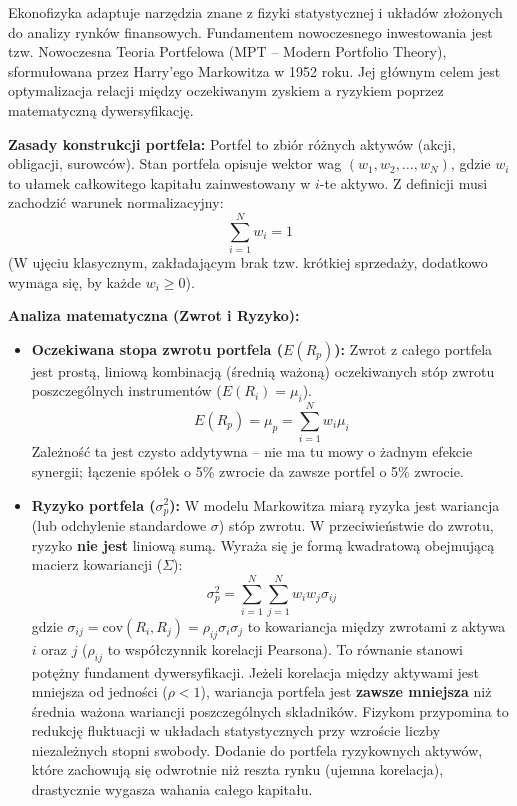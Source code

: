 \documentclass[11pt, a4paper]{article}
\begin{document}
Ekonofizyka adaptuje narzędzia znane z fizyki statystycznej i układów złożonych do analizy rynków finansowych. Fundamentem nowoczesnego inwestowania jest tzw. Nowoczesna Teoria Portfelowa (MPT – Modern Portfolio Theory), sformułowana przez Harry'ego Markowitza w 1952 roku. Jej głównym celem jest optymalizacja relacji między oczekiwanym zyskiem a ryzykiem poprzez matematyczną dywersyfikację.

\textbf{Zasady konstrukcji portfela:}
Portfel to zbiór różnych aktywów (akcji, obligacji, surowców). Stan portfela opisuje wektor wag $(w_1, w_2, \dots, w_N)$, gdzie $w_i$ to ułamek całkowitego kapitału zainwestowany w $i$-te aktywo. Z definicji musi zachodzić warunek normalizacyjny:
\[
\sum_{i=1}^N w_i = 1
\]
(W ujęciu klasycznym, zakładającym brak tzw. krótkiej sprzedaży, dodatkowo wymaga się, by każde $w_i \ge 0$).

\textbf{Analiza matematyczna (Zwrot i Ryzyko):}
\begin{itemize}
    \item \textbf{Oczekiwana stopa zwrotu portfela ($E(R_p)$):}
    Zwrot z całego portfela jest prostą, liniową kombinacją (średnią ważoną) oczekiwanych stóp zwrotu poszczególnych instrumentów ($E(R_i) = \mu_i$).
    \[
    E(R_p) = \mu_p = \sum_{i=1}^N w_i \mu_i
    \]
    Zależność ta jest czysto addytywna – nie ma tu mowy o żadnym efekcie synergii; łączenie spółek o 5\% zwrocie da zawsze portfel o 5\% zwrocie.

    \item \textbf{Ryzyko portfela ($\sigma_p^2$):}
    W modelu Markowitza miarą ryzyka jest wariancja (lub odchylenie standardowe $\sigma$) stóp zwrotu. W przeciwieństwie do zwrotu, ryzyko \textbf{nie jest} liniową sumą. Wyraża się je formą kwadratową obejmującą macierz kowariancji ($\Sigma$):
    \[
    \sigma_p^2 = \sum_{i=1}^N \sum_{j=1}^N w_i w_j \sigma_{ij}
    \]
    gdzie $\sigma_{ij} = \text{cov}(R_i, R_j) = \rho_{ij} \sigma_i \sigma_j$ to kowariancja między zwrotami z aktywa $i$ oraz $j$ ($\rho_{ij}$ to współczynnik korelacji Pearsona). 
    To równanie stanowi potężny fundament dywersyfikacji. Jeżeli korelacja między aktywami jest mniejsza od jedności ($\rho < 1$), wariancja portfela jest \textbf{zawsze mniejsza} niż średnia ważona wariancji poszczególnych składników. Fizykom przypomina to redukcję fluktuacji w układach statystycznych przy wzroście liczby niezależnych stopni swobody. Dodanie do portfela ryzykownych aktywów, które zachowują się odwrotnie niż reszta rynku (ujemna korelacja), drastycznie wygasza wahania całego kapitału.
\end{itemize}
\end{document}
